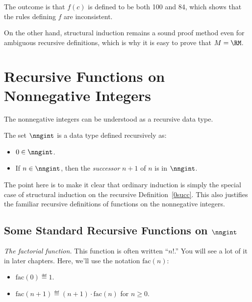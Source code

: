 The outcome is that $f(c)$ is defined to be both 100 and 84, which shows
that the rules defining $f$ are inconsistent.

On the other hand, structural induction remains a sound proof method even
for ambiguous recursive definitions, which is why it is easy to prove
that $M=\RM$.
\fi

\begin{problems}

\practiceproblems
{}

\classproblems
{}

\homeworkproblems
{}

\examproblems
{}
\end{problems}

\section{Recursive Functions on Nonnegative Integers}

The nonnegative integers can be understood as a recursive data type.
\begin{definition}\label{0succ}
The set $\nngint$ is a data type defined recursively as:
\begin{itemize}
\item $0 \in \nngint$.
\item If $n \in \nngint$, then the \emph{successor} $n+1$ of $n$ is in
$\nngint$.
\end{itemize}

\end{definition}

The point here is to make it clear that ordinary induction is simply the
special case of structural induction on the recursive
Definition~\ref{0succ}.  This also justifies the familiar recursive
definitions of functions on the nonnegative integers.

\subsection{Some Standard Recursive Functions on $\nngint$}

\begin{example}\label{factorial-def}

\emph{The factorial%
 function.}  This function is often written
``$n!$.''  You will see a lot of it in later chapters.  Here, we'll use
the notation $\text{fac}(n)$:
\begin{itemize}
\item $\text{fac}(0) \eqdef 1$.
\item $\text{fac}(n+1) \eqdef (n+1)\cdot \text{fac}(n)$ for $n \ge 0$.
\end{itemize}
\end{example}

